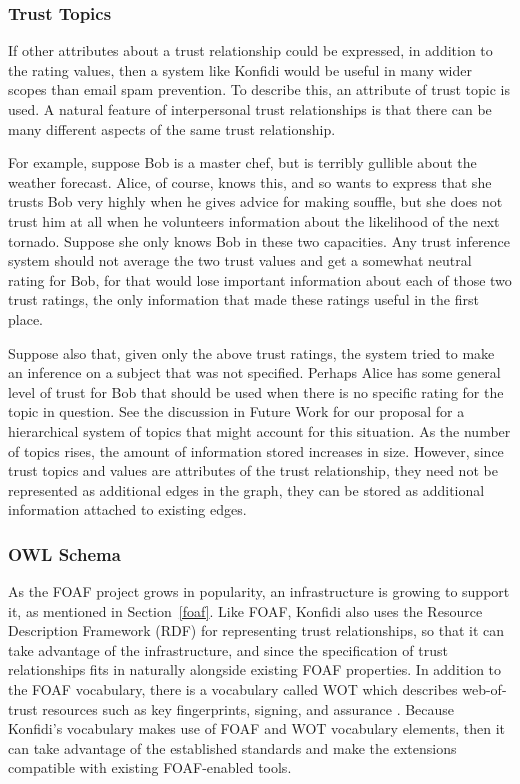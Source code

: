 \documentclass{acm_proc_article-sp}
\begin{document}
\subsubsection{Trust Topics}
If other attributes about a trust relationship could be expressed, in addition to the rating values, then a system like Konfidi would be useful in many wider scopes than email spam prevention.  To describe this, an attribute of trust topic is used.  A natural feature of interpersonal trust relationships is that there can be many different aspects of the same trust relationship.  

For example, suppose Bob is a master chef, but is terribly gullible about the weather forecast.  Alice, of course, knows this, and so wants to express that she trusts Bob very highly when he gives advice for making souffle, but she does not trust him at all when he volunteers information about the likelihood of the next tornado.  Suppose she only knows Bob in these two capacities.  Any trust inference system should not average the two trust values and get a somewhat neutral rating for Bob, for that would lose important information about each of those two trust ratings, the only information that made these ratings useful in the first place.

Suppose also that, given only the above trust ratings, the system tried to make an inference on a subject that was not specified.  Perhaps Alice has some general level of trust for Bob that should be used when there is no specific rating for the topic in question.  See the discussion in Future Work for our proposal for a hierarchical system of topics that might account for this situation.  As the number of topics rises, the amount of information stored increases in size.  However, since trust topics and values are attributes of the trust relationship, they need not be represented as additional edges in the graph, they can be stored as additional information attached to existing edges.

\subsubsection{OWL Schema}
\label{owlschema}
As the FOAF project grows in popularity, an infrastructure is growing to support it, as mentioned in Section~\ref{foaf}.  Like FOAF, Konfidi also uses the Resource Description Framework (RDF) \citep{rdf} for representing trust relationships, so that it can take advantage of the infrastructure, and since the specification of trust relationships fits in naturally alongside existing FOAF properties.  In addition to the FOAF vocabulary, there is a vocabulary called WOT which describes web-of-trust resources such as key fingerprints, signing, and assurance \citep{wot}.  Because Konfidi's vocabulary makes use of FOAF and WOT vocabulary elements, then it can take advantage of the established standards and make the extensions compatible with existing FOAF-enabled tools.
\end{document}
